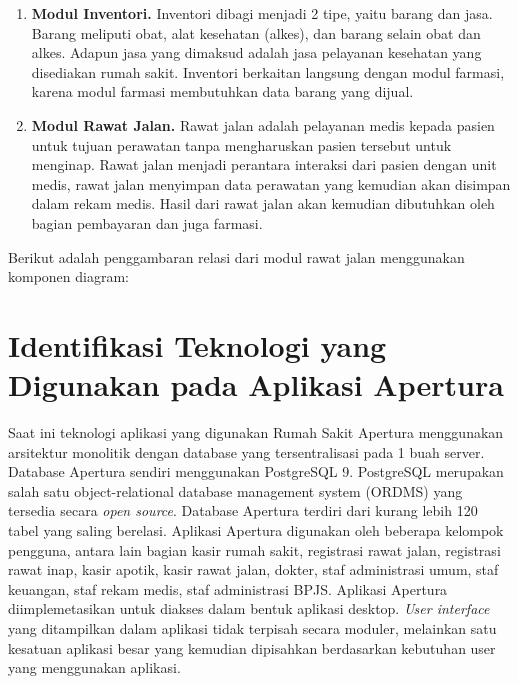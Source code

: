 \begin{enumerate}[leftmargin=*]
	\item \textbf{Modul Inventori.} Inventori dibagi menjadi 2 tipe, yaitu barang dan jasa. Barang meliputi obat, alat kesehatan (alkes), dan barang selain obat dan alkes. Adapun jasa yang dimaksud adalah jasa pelayanan kesehatan yang disediakan rumah sakit. Inventori berkaitan langsung dengan modul farmasi, karena modul farmasi membutuhkan data barang yang dijual.
	\item \textbf{Modul Rawat Jalan.} Rawat jalan adalah pelayanan medis kepada pasien untuk tujuan perawatan tanpa mengharuskan pasien tersebut untuk menginap. Rawat jalan menjadi perantara interaksi dari pasien dengan unit medis, rawat jalan menyimpan data perawatan yang kemudian akan disimpan dalam rekam medis. Hasil dari rawat jalan akan kemudian dibutuhkan oleh bagian pembayaran dan juga farmasi.
\end{enumerate}

Berikut adalah penggambaran relasi dari modul rawat jalan menggunakan komponen diagram:

\begin{adjustbox}{width=1\textwidth}
	\begin{minipage}{\linewidth}
	\end{minipage}
\end{adjustbox}

\section{Identifikasi Teknologi yang Digunakan pada Aplikasi Apertura}
Saat ini teknologi aplikasi yang digunakan Rumah Sakit Apertura menggunakan arsitektur monolitik dengan database yang tersentralisasi pada 1 buah server. Database Apertura sendiri menggunakan PostgreSQL 9. PostgreSQL merupakan salah satu object-relational database management system (ORDMS) yang tersedia secara \textit{open source}. Database Apertura terdiri dari kurang lebih 120 tabel yang saling berelasi. Aplikasi Apertura digunakan oleh beberapa kelompok pengguna, antara lain bagian kasir rumah sakit, registrasi rawat jalan, registrasi rawat inap, kasir apotik, kasir rawat jalan, dokter, staf administrasi umum, staf keuangan, staf rekam medis, staf administrasi BPJS.
Aplikasi Apertura diimplemetasikan untuk diakses dalam bentuk aplikasi desktop. \textit{User interface} yang ditampilkan dalam aplikasi tidak terpisah secara moduler, melainkan satu kesatuan aplikasi besar yang kemudian dipisahkan berdasarkan kebutuhan user yang menggunakan aplikasi.

